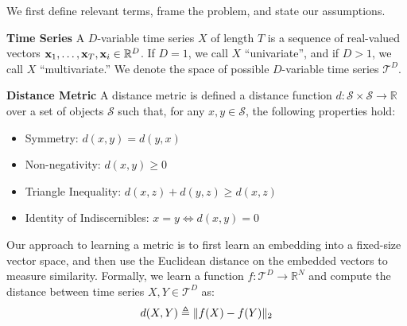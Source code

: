 
We first define relevant terms, frame the problem, and state our assumptions.

\begin{Definition}{\textbf{Time Series} A $D$-variable time series $X$ of length $T$ is a sequence of real-valued vectors $\mathbf{x}_1,\ldots,\mathbf{x}_T, \mathbf{x}_i \in \mathbb{R}^D$. If $D = 1$, we call $X$ ``univariate'', and if $D > 1$, we call $X$ ``multivariate.''} We denote the space of possible $D$-variable time series $\mathcal{T}^D$.
\end{Definition}
\begin{Definition}{\textbf{Distance Metric} A distance metric is defined a distance function $d: \mathcal{S} \times \mathcal{S} \rightarrow \mathbb{R}$ over a set of objects $\mathcal{S}$ such that, for any $x, y \in \mathcal{S}$, the following properties hold:

\begin{itemize}
	\item Symmetry: $d(x,y) = d(y,x)$
    \item Non-negativity: $d(x, y) \geq 0$
    \item Triangle Inequality: $d(x,z) + d(y,z) \geq d(x, z)$
    \item Identity of Indiscernibles: $x = y \Leftrightarrow d(x, y) = 0$
\end{itemize}}
\end{Definition}

Our approach to learning a metric is to first learn an embedding into a fixed-size vector space, and then use the Euclidean distance on the embedded vectors to measure similarity. Formally, we learn a function $f: \mathcal{T}^D \rightarrow \mathbb{R}^N$ and compute the distance between time series $X, Y \in \mathcal{T}^D$ as:
\begin{align}
	d(X, Y) \triangleq \lVert f(X) - f(Y)\rVert_2
\end{align}



